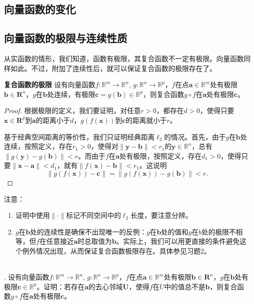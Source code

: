 \documentclass[12pt,UTF8]{ctexbook}
\begin{document}
\begin{appendix}

\chapter{向量函数的变化}

\section{向量函数的极限与连续性质}

从实函数的情形，我们知道，函数有极限，其复合函数不一定有极限。向量函数同样如此。不过，附加了连续性后，就可以保证复合函数的极限存在了。
\begin{tm}{\textbf{复合函数的极限}}
    设有向量函数$f:\mathbb{R}^m \rightarrow \mathbb{R}^n, \, g: \mathbb{R}^n \rightarrow \mathbb{R}^p$，$f$在点$\mathbf{a}\in\mathbb{R}^m$处有极限$\mathbf{b}\in\mathbf{R}^n$，$g$在$\mathbf{b}$处连续，有极限$\mathbf{c} = g(\mathbf{b})\in \mathbb{R}^p$，则复合函数$g\circ f$在$\mathbf{a}$处有极限$\mathbf{c}$。
\end{tm}
\begin{proof}
    根据极限的定义，我们要证明，对任意$r>0$，都存在$d>0$，使得只要$\mathbf{x}\in\mathbf{R}^p$到$\mathbf{a}$的距离小于$d$，$g(f(\mathbf{x}))$到$\mathbf{c}$的距离就小于$r$。

    基于经典空间距离的等价性，我们只证明经典距离$\ell_2$的情况。首先，由于$g$在$\mathbf{b}$处连续，按照定义，存在$r_1>0$，使得对$\|\mathbf{y} - \mathbf{b}\| < r_1$的$\mathbf{y}\in\mathbb{R}^n$，总有$\|g(\mathbf{y}) - g(\mathbf{b}) \| < r$。而由于$f$在$\mathbf{a}$处有极限，按照定义，存在$d_1 > 0$，使得只要$\|\mathbf{x} - \mathbf{a}\| < d_1$，就有$\| f(\mathbf{x}) - \mathbf{b}\| < r_1$。这说明
    $$\| g(f(\mathbf{x})) - \mathbf{c}\| = \| g(f(\mathbf{x})) - g(\mathbf{b})\| < r.$$
\end{proof}
注意：
\begin{enumerate}
    \item 证明中使用$\|\cdot\|$标记不同空间中的$\ell_2$长度，要注意分辨。
    \item $g$在$\mathbf{b}$处的连续性是确保不出现唯一的反例：$g$在$\mathbf{b}$处的值和$g$在$b$处的极限不相等，但$f$在任意接近$\mathbf{a}$时总取值为$\mathbf{b}$。实际上，我们可以用更直接的条件避免这个例外情况出现，从而保证复合函数极限存在。具体参见习题2。
\end{enumerate}

\begin{xt}
    \mbox{} \\
    . 设有向量函数$f:\mathbb{R}^m \rightarrow \mathbb{R}^n, \, g: \mathbb{R}^n \rightarrow \mathbb{R}^p$，$f$在点$\mathbf{a}\in\mathbb{R}^m$处有极限$\mathbf{b}\in\mathbf{R}^n$，$g$在$\mathbf{b}$处有极限$\mathbf{c}\in \mathbb{R}^p$。证明：若存在$\mathbf{a}$的去心邻域$\mathbf{U}$，使得$f$在$U$中的值总不是$\mathbf{b}$，则复合函数$g\circ f$在$\mathbf{a}$处有极限$\mathbf{c}$。
\end{xt}


\end{appendix}
\end{document}
